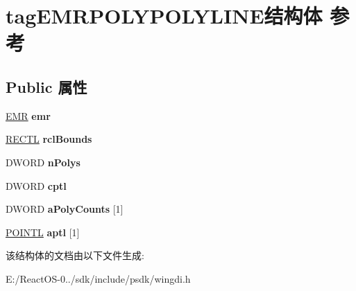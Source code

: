 \hypertarget{structtag_e_m_r_p_o_l_y_p_o_l_y_l_i_n_e}{}\section{tag\+E\+M\+R\+P\+O\+L\+Y\+P\+O\+L\+Y\+L\+I\+N\+E结构体 参考}
\label{structtag_e_m_r_p_o_l_y_p_o_l_y_l_i_n_e}
\subsection*{Public 属性}
\begin{DoxyCompactItemize}
\item 
\mbox{\label{structtag_e_m_r_p_o_l_y_p_o_l_y_l_i_n_e_a78bc061aa66c4b5ab6265ccc53580e45}} 
\hyperlink{structtag_e_m_r}{E\+MR} {\bfseries emr}
\item 
\mbox{\label{structtag_e_m_r_p_o_l_y_p_o_l_y_l_i_n_e_aeb3dd45d4250bfb55ed340216d16b693}} 
\hyperlink{struct___r_e_c_t_l}{R\+E\+C\+TL} {\bfseries rcl\+Bounds}
\item 
\mbox{\label{structtag_e_m_r_p_o_l_y_p_o_l_y_l_i_n_e_af59aeabde0943d7db88c5b1783431f08}} 
D\+W\+O\+RD {\bfseries n\+Polys}
\item 
\mbox{\label{structtag_e_m_r_p_o_l_y_p_o_l_y_l_i_n_e_af88b7d66e204f17a189fa9546097cf27}} 
D\+W\+O\+RD {\bfseries cptl}
\item 
\mbox{\label{structtag_e_m_r_p_o_l_y_p_o_l_y_l_i_n_e_ae051c06d0fa999048b316d2626d519ac}} 
D\+W\+O\+RD {\bfseries a\+Poly\+Counts} \mbox{[}1\mbox{]}
\item 
\mbox{\label{structtag_e_m_r_p_o_l_y_p_o_l_y_l_i_n_e_a2eee3755299758ca6fb87e6fb8f69df0}} 
\hyperlink{struct___p_o_i_n_t_l}{P\+O\+I\+N\+TL} {\bfseries aptl} \mbox{[}1\mbox{]}
\end{DoxyCompactItemize}


该结构体的文档由以下文件生成\+:\begin{DoxyCompactItemize}
\item 
E\+:/\+React\+O\+S-\/0../sdk/include/psdk/wingdi.\+h\end{DoxyCompactItemize}
